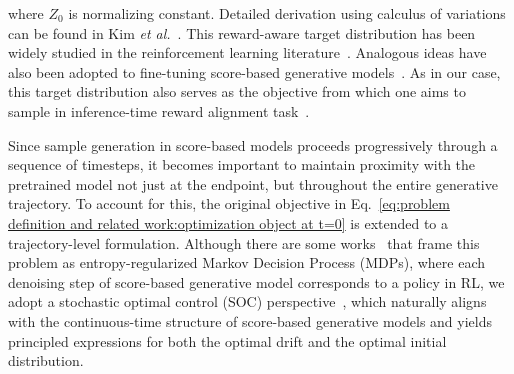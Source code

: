 where $Z_0$ is normalizing constant. Detailed derivation using calculus of variations can be found in Kim \textit{et al.}~\cite{kim2025inference}.
This reward-aware target distribution has been widely studied in the reinforcement learning literature~\cite{haarnoja2017reinforcement, geist2019theory, schulman2017equivalence, neu2017unified, levine1805reinforcement}. Analogous ideas have also been adopted to fine-tuning score-based generative models~\cite{uehara2024bridging, tang2024finetuningdiffusionmodelsstochastic, domingo-enrich2025adjoint, black2024ddpo, yang2-24D3po,clark2024draft, prabhudesai2024alignprop, fan2023reinforcement, lee2023aligning, uehara2024finetuningcontinuoustimediffusionmodels}. As in our case, this target distribution also serves as the objective from which one aims to sample in inference-time reward alignment task~\cite{uehara2025inference, kim2025DAS, kim2025inference}.

Since sample generation in score-based models proceeds progressively through a sequence of timesteps, it becomes important to maintain proximity with the pretrained model not just at the endpoint, but throughout the entire generative trajectory. To account for this, the original objective in Eq.~\ref{eq:problem definition and related work:optimization object at t=0} is extended to a trajectory-level formulation.
Although there are some works~\cite{prabhudesai2024alignprop, fan2023reinforcement, black2024ddpo} that frame this problem as entropy-regularized Markov Decision Process (MDPs), where each denoising step of score-based generative model corresponds to a policy in RL, 
we adopt a stochastic optimal control (SOC) perspective~\cite{uehara2024finetuningcontinuoustimediffusionmodels, tang2024finetuningdiffusionmodelsstochastic, domingo-enrich2025adjoint}, which naturally aligns with the continuous-time structure of score-based generative models and yields principled expressions for both the optimal drift and the optimal initial distribution.


